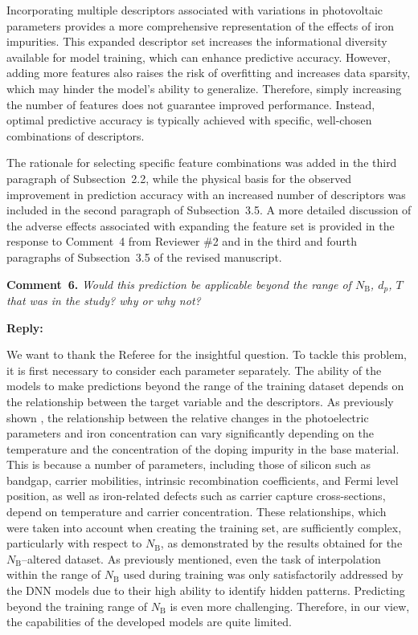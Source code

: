 \documentclass[a4paper,fleqn]{cas-sc}
\begin{document}
Incorporating multiple descriptors associated with variations in photovoltaic parameters provides
a more comprehensive representation of the effects of iron impurities.
This expanded descriptor set increases the informational diversity available for model training, which can enhance predictive accuracy.
However, adding more features also raises the risk of overfitting and increases data sparsity,
which may hinder the model's ability to generalize.
Therefore, simply increasing the number of features does not guarantee improved performance.
Instead, optimal predictive accuracy is typically achieved with specific, well-chosen combinations of descriptors.

The rationale for selecting specific feature combinations was added in the third paragraph of Subsection~2.2,
while the physical basis for the observed improvement in prediction accuracy with an increased number of descriptors
was included in the second paragraph of Subsection~3.5.
A more detailed discussion of the adverse effects associated with expanding the feature set
is provided in the response to Comment~4 from Reviewer \#2 and in the third and fourth paragraphs of Subsection~3.5
of the revised manuscript.


\vspace{1cm}
\noindent
\textcolor[rgb]{0.00,0.50,1.00}{\textbf{Comment~6.}}
\emph{Would this prediction be applicable beyond the range of $N_\mathrm{B}$, $d_p$, $T$ that was in the study? why or why not?}

\noindent
\textcolor[rgb]{0.51,0.00,0.00}{\textbf{Reply:}}

We want to thank the Referee for the insightful question. 
To tackle this problem, it is first necessary to consider each parameter separately. 
The ability of the models to make predictions beyond the range of the training dataset
depends on the relationship between the target variable and the descriptors. 
As previously shown \cite{Olikh2025MSEB}, the relationship between the relative changes in the photoelectric parameters 
and iron concentration can vary significantly depending on the temperature and the concentration of the doping impurity in the base material. 
This is because a number of parameters, including those of silicon such as bandgap, carrier mobilities, 
intrinsic recombination coefficients, and Fermi level position, 
as well as iron-related defects such as carrier capture cross-sections, depend on temperature and carrier concentration.
These relationships, which were taken into account when creating the training set, are sufficiently complex,
particularly with respect to $N_\mathrm{B}$, as demonstrated by the results obtained for the $N_\mathrm{B}$--altered dataset. 
As previously mentioned, even the task of interpolation within the range of $N_\mathrm{B}$ used during training
was only satisfactorily addressed by the DNN models due to their high ability to identify hidden patterns. 
Predicting beyond the training range of $N_\mathrm{B}$ is even more challenging. 
Therefore, in our view, the capabilities of the developed models are quite limited.
\end{document}

